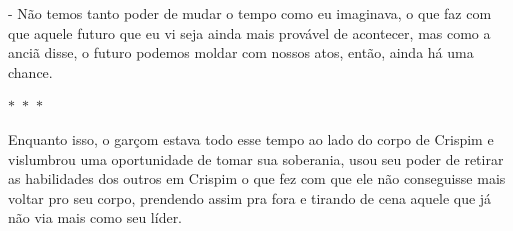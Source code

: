 - Não temos tanto poder de mudar o tempo como eu imaginava, o que faz com que aquele futuro que eu vi seja ainda mais provável de acontecer, mas como a anciã disse, o futuro podemos moldar com nossos atos, então, ainda há uma chance.

\begin{center}
  $\ast$~$\ast$~$\ast$
\end{center}
   
Enquanto isso, o garçom estava todo esse tempo ao lado do corpo de Crispim e vislumbrou uma oportunidade de tomar sua soberania, usou seu poder de retirar as habilidades dos outros em Crispim o que fez com que ele não conseguisse mais voltar pro seu corpo, prendendo assim pra fora e tirando de cena aquele que já não via mais como seu líder.


